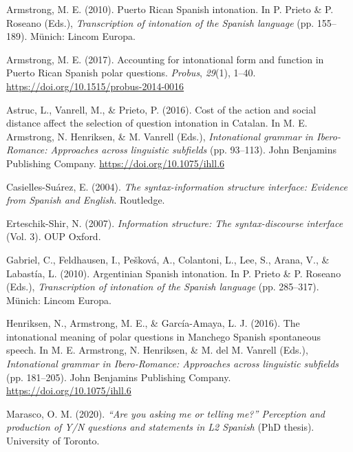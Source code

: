 \documentclass[]{article}
\newlength{\cslhangindent}
\newenvironment{CSLReferences}[2] %
 {%
  \setlength{\parindent}{0pt}
  \ifodd #1 \everypar{\setlength{\hangindent}{\cslhangindent}}\ignorespaces\fi
  \ifnum #2 > 0
  \setlength{\parskip}{#2\baselineskip}
  \fi
 }%
 {}
\begin{document}
\hypertarget{refs}{}
\begin{CSLReferences}{1}{0}
\leavevmode{}%
Armstrong, M. E. (2010). Puerto {R}ican {S}panish intonation. In P. Prieto \& P. Roseano (Eds.), \emph{Transcription of intonation of the {S}panish language} (pp. 155--189). Münich: Lincom Europa.

\leavevmode{}%
Armstrong, M. E. (2017). Accounting for intonational form and function in {P}uerto {R}ican {S}panish polar questions. \emph{Probus}, \emph{29}(1), 1--40. \url{https://doi.org/10.1515/probus-2014-0016}

\leavevmode{}%
Astruc, L., Vanrell, M., \& Prieto, P. (2016). Cost of the action and social distance affect the selection of question intonation in {C}atalan. In M. E. Armstrong, N. Henriksen, \& M. Vanrell (Eds.), \emph{Intonational grammar in {I}bero-{R}omance: {A}pproaches across linguistic subfields} (pp. 93--113). John Benjamins Publishing Company. \url{https://doi.org/10.1075/ihll.6}

\leavevmode{}%
Casielles-Suárez, E. (2004). \emph{The syntax-information structure interface: {E}vidence from {S}panish and {E}nglish}. Routledge.

\leavevmode{}%
Erteschik-Shir, N. (2007). \emph{Information structure: {T}he syntax-discourse interface} (Vol. 3). OUP Oxford.

\leavevmode{}%
Gabriel, C., Feldhausen, I., Pešková, A., Colantoni, L., Lee, S., Arana, V., \& Labastía, L. (2010). {A}rgentinian {S}panish intonation. In P. Prieto \& P. Roseano (Eds.), \emph{Transcription of intonation of the {S}panish language} (pp. 285--317). Münich: Lincom Europa.

\leavevmode{}%
Henriksen, N., Armstrong, M. E., \& García-Amaya, L. J. (2016). The intonational meaning of polar questions in {M}anchego {S}panish spontaneous speech. In M. E. Armstrong, N. Henriksen, \& M. del M. Vanrell (Eds.), \emph{Intonational grammar in {I}bero-{R}omance: {A}pproaches across linguistic subfields} (pp. 181--205). John Benjamins Publishing Company. \url{https://doi.org/10.1075/ihll.6}

\leavevmode{}%
Marasco, O. M. (2020). \emph{{``Are you asking me or telling me?''} {P}erception and production of {Y/N} questions and statements in {L}2 {S}panish} (PhD thesis). University of Toronto.


\end{CSLReferences}
\end{document}
